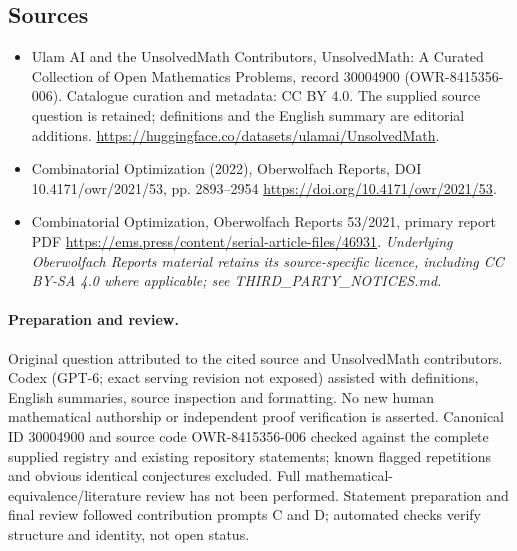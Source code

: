 \documentclass[11pt]{article}
\begin{document}
\subsection{Sources}
\begin{itemize}
\item[\hypertarget{source:30004900:1}{S1}] Ulam AI and the UnsolvedMath Contributors, UnsolvedMath: A Curated Collection of Open Mathematics Problems, record 30004900 (OWR-8415356-006). Catalogue curation and metadata: CC BY 4.0. The supplied source question is retained; definitions and the English summary are editorial additions.
\url{https://huggingface.co/datasets/ulamai/UnsolvedMath}.
\item[\hypertarget{source:30004900:2}{S2}] Combinatorial Optimization (2022), Oberwolfach Reports, DOI 10.4171/owr/2021/53, pp. 2893--2954
\url{https://doi.org/10.4171/owr/2021/53}.
\item[\hypertarget{source:30004900:3}{S3}] Combinatorial Optimization, Oberwolfach Reports 53/2021, primary report PDF
\url{https://ems.press/content/serial-article-files/46931}.
\textit{Underlying Oberwolfach Reports material retains its source-specific licence, including CC BY-SA 4.0 where applicable; see THIRD\_PARTY\_NOTICES.md.}
\end{itemize}
\paragraph{Preparation and review.}
Original question attributed to the cited source and UnsolvedMath contributors. Codex (GPT-6; exact serving revision not exposed) assisted with definitions, English summaries, source inspection and formatting. No new human mathematical authorship or independent proof verification is asserted. Canonical ID 30004900 and source code OWR-8415356-006 checked against the complete supplied registry and existing repository statements; known flagged repetitions and obvious identical conjectures excluded. Full mathematical-equivalence/literature review has not been performed. Statement preparation and final review followed contribution prompts C and D; automated checks verify structure and identity, not open status.
\label{end:30004900}
\end{document}
